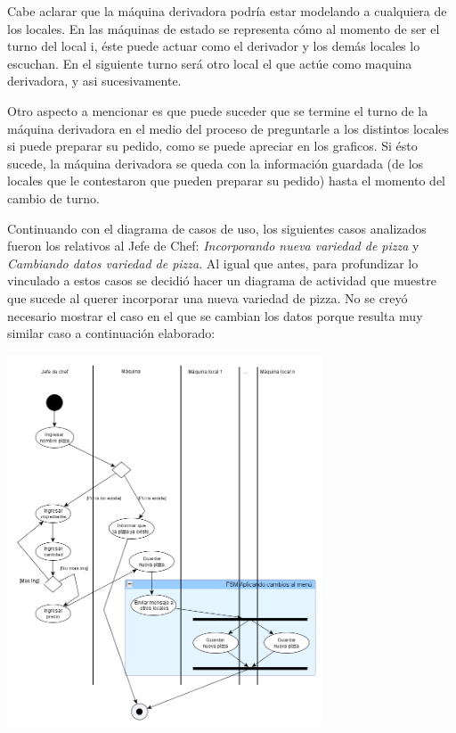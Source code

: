 \documentclass[a4paper,11pt] {article}
\begin{document}
Cabe aclarar que la m\'aquina derivadora podr\'ia estar modelando a cualquiera de los locales. En las m\'aquinas de estado se representa c\'omo al momento de ser el turno del local i, \'este puede actuar como el derivador y los dem\'as locales lo escuchan. En el siguiente turno ser\'a otro local el que act\'ue como maquina derivadora, y asi sucesivamente.

Otro aspecto a mencionar es que puede suceder que se termine el turno de la m\'aquina derivadora en el medio del proceso de preguntarle a los distintos locales si puede preparar su pedido, como se puede apreciar en los graficos. Si \'esto sucede, la m\'aquina derivadora se queda con la informaci\'on guardada (de los locales que le contestaron que pueden preparar su pedido) hasta el momento del cambio de turno.


Continuando con el diagrama de casos de uso, los siguientes casos analizados fueron los relativos al Jefe de Chef: \textit{Incorporando nueva variedad de pizza} y \textit{Cambiando datos variedad de pizza}. Al igual que antes, para profundizar lo vinculado a estos casos se decidi\'o hacer un diagrama de actividad que muestre que sucede al querer incorporar una nueva variedad de pizza. No se crey\'o necesario mostrar el caso en el que se cambian los datos porque resulta muy similar caso a continuaci\'on elaborado:

\begin{center}
 \includegraphics[width=0.7\textwidth]{Diagramas/DiagramaActividadNuevaPizza.png}
\end{center}
\end{document}
